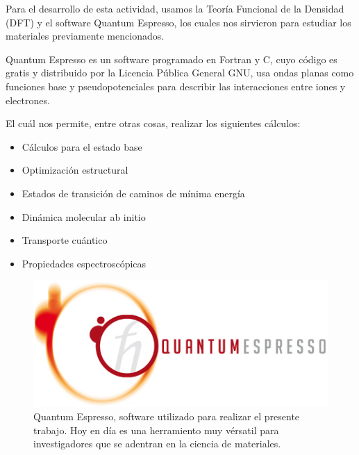 
Para el desarrollo de esta actividad, usamos la Teoría Funcional de la Densidad (DFT)
y el software Quantum Espresso, los cuales nos sirvieron para estudiar los materiales
previamente mencionados.

Quantum Espresso es un software programado en Fortran y C, cuyo código es gratis y distribuido por la Licencia
Pública General GNU, usa ondas planas como funciones base y pseudopotenciales para describir las 
interacciones entre iones y electrones. \cite{WinNT}

\vspace{0.5cm}

El cuál nos permite, entre otras cosas, realizar los siguientes cálculos: \cite{WinNT}

\begin{itemize}
    \item Cálculos para el estado base
    \item Optimización estructural 
    \item Estados de transición de caminos de mínima energía
    \item Dinámica molecular ab initio
    \item Transporte cuántico
    \item Propiedades espectroscópicas
\end{itemize}

\vspace{1cm}

\begin{figure}[H]
    \centering
    \includegraphics[scale=0.5]{logo_header.jpg}
    \caption{Quantum Espresso, software utilizado para realizar el presente trabajo. Hoy en día 
             es una herramiento muy vérsatil para investigadores que se adentran en la ciencia 
             de materiales.}
\end{figure}

\newpage